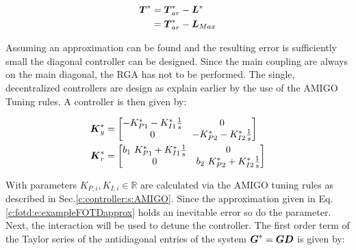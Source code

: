 \begin{align}
\begin{split}
\mbox{\boldmath$T$}^* &= \mbox{\boldmath$T$}_{ar}^* - \mbox{\boldmath$L$}^* \\
&= \mbox{\boldmath$T$}_{ar}^* - \mbox{\boldmath$L$}_{Max} 
\end{split}
\label{c:fotd:e:CombinationTimeConstant}
\end{align}

Assuming an approximation can be found and the resulting error is sufficiently small the diagonal controller can be designed. Since the main coupling are always on the main diagonal, the RGA has not to be performed. The single, decentralized controllers are design as explain earlier by the use of the AMIGO Tuning rules. A controller is then given by:

\begin{align}
\begin{split}
\mbox{\boldmath$K$}_y^* &= \begin{bmatrix}
-K_{P1}^* - K_{I1}^*\frac{1}{s} & 0 \\
0 & -K_{P2}^* - K_{I2}^*\frac{1}{s}
\end{bmatrix} \\
\mbox{\boldmath$K$}_r^* &= \begin{bmatrix}
b_1~K_{P1}^* + K_{I1}^*\frac{1}{s} & 0 \\
0 & b_2~K_{P2}^* + K_{I2}^*\frac{1}{s}
\end{bmatrix} 
\end{split}
\label{c:fotd:e:exampleTransformedControler}
\end{align}

%  

With parameters $K_{P,i},K_{I,i} \in \mathbb{R}$ are calculated via the AMIGO tuning rules as described in Sec.\ref{c:controller:s:AMIGO}. Since the approximation given in Eq.\ref{c:fotd:e:exampleFOTDapprox} holds an inevitable error so do the parameter. \\

Next, the interaction will be used to detune the controller. The first order term of the Taylor series of the antidiagonal entries of the system $\mbox{\boldmath$G$}^* = \mbox{\boldmath$G$} \mbox{\boldmath$D$}$ is given by:


